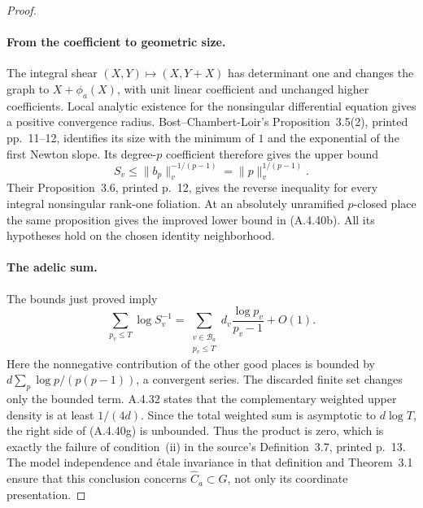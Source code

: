 \begin{proof}
\paragraph{From the coefficient to geometric size.}
The integral shear $(X,Y)\mapsto(X,Y+X)$ has determinant one and
changes the graph to $X+\phi_a(X)$, with unit linear coefficient
and unchanged higher coefficients.  Local analytic existence for
the nonsingular differential equation gives a positive convergence
radius.  Bost--Chambert-Loir's Proposition~3.5(2), printed
pp.~11--12, identifies its size with the minimum of $1$ and the
exponential of the first Newton slope.  Its degree-$p$ coefficient
therefore gives the upper bound
\[
           S_v\le\|b_p\|_v^{-1/(p-1)}
                 =\|p\|_v^{1/(p-1)}.
\]
Their Proposition~3.6, printed p.~12, gives the reverse inequality
for every integral nonsingular rank-one foliation.  At an absolutely
unramified $p$-closed place the same proposition gives the improved
lower bound in (A.4.40b).  All its hypotheses hold on the chosen
identity neighborhood.\cite{AuditBostChambertLoir2008v3}

\paragraph{The adelic sum.}
The bounds just proved imply
\[
 \sum_{p_v\le T}\log S_v^{-1}
   =\sum_{\substack{v\in\mathcal B_a\\p_v\le T}}
                  d_v\frac{\log p_v}{p_v-1}+O(1).
 \tag{A.4.40g}
\]
Here the nonnegative contribution of the other good places is
bounded by $d\sum_p\log p/(p(p-1))$, a convergent series.  The
discarded finite set changes only the bounded term.  A.4.32 states
that the complementary weighted upper density is at least
$1/(4d)$.  Since the total weighted sum is asymptotic to
$d\log T$, the right side of (A.4.40g) is unbounded.  Thus the
product is zero, which is exactly the failure of condition~(ii) in
the source's Definition~3.7, printed p.~13.  The model independence
and \'etale invariance in that definition and Theorem~3.1 ensure
that this conclusion concerns $\widehat C_a\subset G$, not only
its coordinate presentation.\cite{AuditBostChambertLoir2008v3}


\end{proof}
